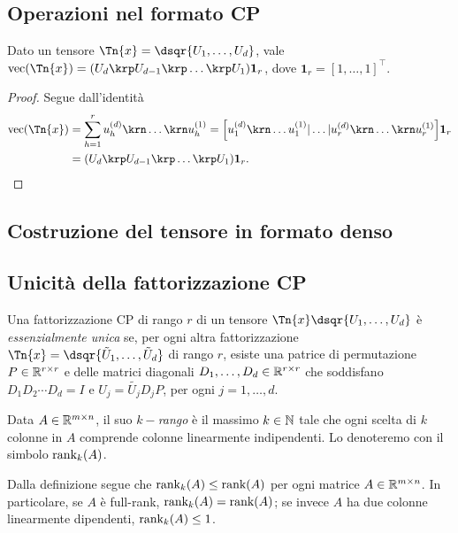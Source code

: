
\subsection{Operazioni nel formato CP}
  
\begin{lemma}
  Dato un tensore $ \Tn{x} = \dsqr{U_1,\ldots,U_d} $, vale $ \vec(\Tn{x}) = \left( U_d \krp U_{d-1}
    \krp \ldots \krp U_1 \right) \mathbf{1}_r$, dove $ \mathbf{1}_r = \left[ 1, \ldots, 1
    \right]^{\top} $.
\end{lemma}
\begin{proof}
  Segue dall'identità
  \begin{equation*}
    \begin{aligned}
      \vec({\Tn{x}}) &= \sum_{h=1}^r u_h^{(d)} \krn \ldots \krn u_h^{(1)} = \left[ u_1^{(d)} 
  \krn \ldots u_1^{(1)} | \ldots | u_r^{(d)} \krn \ldots \krn u_r^{(1)}\right]\mathbf{1}_r \\
                     &= \left( U_d \krp U_{d-1} \krp \ldots \krp U_1 \right) \mathbf{1}_r.
    \end{aligned}
  \end{equation*}
\end{proof}

\subsection{Costruzione del tensore in formato denso}

\subsection{Unicità della fattorizzazione CP}

\begin{definition}
  Una fattorizzazione CP di rango $ r $ di un tensore $ \Tn{x} \dsqr{U_1, \ldots, U_d}$ è
  \emph{essenzialmente unica} se, per ogni altra fattorizzazione $ \Tn{x} = \dsqr{\tilde{U}_1,
  \ldots, \tilde{U}_d}$ di rango $ r $, esiste una patrice di permutazione $ P \in \mathbb{R}^{r \times r} $
  e delle matrici diagonali $ D_1, \ldots, D_d \in \mathbb{R}^{r \times r} $ che soddisfano $ D_1 D_2 \cdots D_d =
  I$ e $U_j = \tilde{U_j}D_jP$, per ogni $ j = 1, \ldots, d $.
\end{definition}

\begin{definition}[$ k- $rango]
  Data $ A \in \mathbb{R}^{m\times n} $, il suo \emph{$ k- $rango} è il massimo $ k \in \mathbb{N} $ tale che ogni
  scelta di $ k $ colonne in $ A $ comprende colonne linearmente indipendenti. Lo denoteremo con il
  simbolo $ \text{rank}_k(A) $.
\end{definition}
\begin{remark}
  Dalla definizione segue che $ \text{rank}_k(A) \le \text{rank}(A) $ per ogni matrice $ A \in \mathbb{R}^{m \times n} $. In
  particolare, se $ A $ è full-rank, $ \text{rank}_k(A) = \text{rank}(A) $; se invece $ A $ ha due colonne linearmente
  dipendenti, $ \text{rank}_k(A) \le 1 $.
\end{remark}

